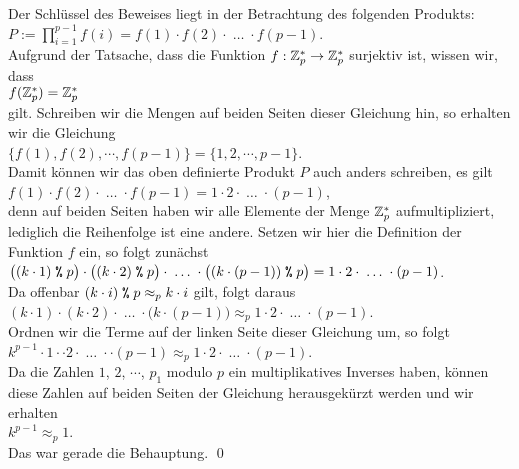 Der Schl\"{u}ssel des Beweises liegt in der Betrachtung des folgenden Produkts:
\\[0.2cm]
\hspace*{1.3cm}
$P := \prod\limits_{i=1}^{p-1} f(i) = f(1) \cdot f(2) \cdot \;\dots\; \cdot f(p-1)$.
\\[0.2cm]
Aufgrund der Tatsache, dass die Funktion $f:\mathbb{Z}_{p}^* \rightarrow \mathbb{Z}_{p}^*$ surjektiv ist, wissen  wir, dass
\\[0.2cm]
\hspace*{1.3cm}
$f(\mathbb{Z}_{p}^*) = \mathbb{Z}_{p}^*$
\\[0.2cm]
gilt. Schreiben  wir die Mengen auf beiden Seiten dieser Gleichung hin, so erhalten wir die Gleichung
\\[0.2cm]
\hspace*{1.3cm}
$\bigl\{ f(1), f(2), \cdots, f(p-1) \bigr\} = \bigl\{ 1, 2, \cdots, p-1 \bigr\}$.
\\[0.2cm]
Damit k\"{o}nnen wir das oben definierte Produkt $P$ auch anders schreiben, es gilt
\\[0.2cm]
\hspace*{1.3cm}
$f(1) \cdot f(2) \cdot \;\dots\; \cdot f(p-1) = 1 \cdot 2 \cdot \;\dots\; \cdot (p-1)$,
\\[0.2cm]
denn auf beiden Seiten haben wir alle Elemente der Menge $\mathbb{Z}_{p}^*$ aufmultipliziert, lediglich die
Reihenfolge ist eine andere.  Setzen wir hier die Definition der Funktion $f$ ein, so
folgt zun\"{a}chst
\\[0.2cm]
\hspace*{1.3cm}
$\bigl((k \cdot 1) \;\texttt{\%}\; p\bigr) \cdot \bigl((k \cdot 2) \;\texttt{\%}\; p\bigr) \cdot \;\dots\; \cdot 
 \bigl((k \cdot (p-1)) \;\texttt{\%}\; p\bigr) =
  1 \cdot 2 \cdot \;\dots\; \cdot (p-1)$.
\\[0.2cm]
Da offenbar $(k \cdot i) \;\texttt{\%}\; p \approx_p k \cdot i$ gilt, folgt daraus
\\[0.2cm]
\hspace*{1.3cm}
$(k \cdot 1) \cdot (k \cdot 2) \cdot \;\dots\; \cdot \bigl(k\cdot(p-1)) \approx_p 
  1 \cdot 2 \cdot \;\dots\; \cdot (p-1)$.
\\[0.2cm]
Ordnen wir die Terme auf der linken Seite dieser Gleichung um, so folgt
\\[0.2cm]
\hspace*{1.3cm}
$k^{p-1} \cdot 1 \cdot \cdot 2 \cdot \;\dots\; \cdot \cdot(p-1) \approx_p 
  1 \cdot 2 \cdot \;\dots\; \cdot (p-1)
$.
\\[0.2cm]
Da die Zahlen $1$, $2$, $\cdots$, $p_1$ modulo $p$ ein multiplikatives Inverses haben, k\"{o}nnen diese Zahlen
auf beiden Seiten der Gleichung herausgek\"{u}rzt werden und wir erhalten
\\[0.2cm]
\hspace*{1.3cm}
$k^{p-1} \approx_p 1$.
\\[0.2cm]
Das war gerade die Behauptung. \qed

